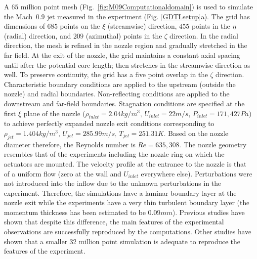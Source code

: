\documentclass[english]{aiaa-tc}
\begin{document}
 A $65$ million point mesh (Fig.~\ref{fig:M09Computationaldomain}) is
 used to simulate the Mach~$0.9$ jet measured in the experiment (Fig.
 \ref{GDTLsetup}a).  The grid has dimensions of $685$ points on the
 $\xi$ (streamwise) direction, $455$ points in the $\eta$ (radial)
 direction, and $209$ (azimuthal) points in the $\zeta$ direction. In
 the radial direction, the mesh is refined in the nozzle region and
 gradually stretched in the far field. At the exit of the nozzle, the
 grid maintains a constant axial spacing until after the potential
 core length; then stretches in the streamwise direction as well. To
 preserve continuity, the grid has a five point overlap in the $\zeta$
 direction. Characteristic boundary conditions\cite{bj2000-1} are
 applied to the upstream (outside the nozzle) and radial boundaries.
 Non-reflecting conditions are applied to the downstream and far-field
 boundaries. Stagnation conditions are specified at the first $\xi$
 plane of the nozzle ($\rho_{inlet}=2.04kg/m^{3}$, $U_{inlet}=22m/s$, $P_{inlet}=171,427Pa$) to
 achieve perfectly expanded nozzle exit conditions corresponding to
 $\rho_{jet}=1.404kg/m^{3}$, $U_{jet}=285.99m/s$, $T_{jet}=251.31K$.
 Based on the nozzle diameter therefore, the Reynolds number is
 $Re=635,308$. The nozzle geometry resembles that of the 
 experiments including the nozzle ring on which the actuators are
 mounted. 
The velocity profile at the entrance to the nozzle is that
 of a uniform flow (zero at the wall and $U_{inlet}$ everywhere else).
 Perturbations were not introduced into the inflow due to the
 unknown perturbations in the experiment. Therefore, the simulations
 have a laminar boundary layer at the nozzle exit while the
 experiments have a very thin turbulent boundary layer (the momentum
 thickness has been estimated to be $0.09 mm$).  Previous studies have
 shown that despite this difference, the main features of the
 experimental observations are successfully reproduced by the
 computations\cite{gdv2011-POF,SpethCF2013}.  Other studies have shown
 that a smaller $32$ million point simulation is adequate to reproduce
 the features of the experiment\cite{spethASME2013}.
\end{document}
